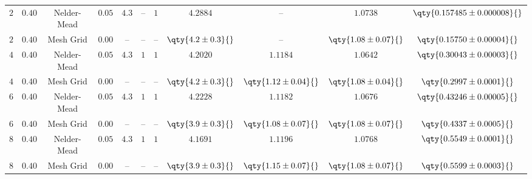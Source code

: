 \begin{tabular}{cc|ccccc|cccc}
    \rowcolor{LightCyan}
    $2$ & $0.40$ & Nelder-Mead & $0.05$ & $4.3$ & -- & $1$ & $4.2884$ & -- & $1.0738$ & $\qty{0.157485 \pm 0.000008}{}$ \\
    $2$ & $0.40$ & Mesh Grid & $0.00$ & -- & -- & -- & $\qty{4.2 \pm 0.3}{}$ & -- & $\qty{1.08 \pm 0.07}{}$ & $\qty{0.15750 \pm 0.00004}{}$ \\
    \rowcolor{LightCyan}
    $4$ & $0.40$ & Nelder-Mead & $0.05$ & $4.3$ & $1$ & $1$ & $4.2020$ & $1.1184$ & $1.0642$ & $\qty{0.30043 \pm 0.00003}{}$ \\
    $4$ & $0.40$ & Mesh Grid & $0.00$ & -- & -- & -- & $\qty{4.2 \pm 0.3}{}$ & $\qty{1.12 \pm 0.04}{}$ & $\qty{1.08 \pm 0.04}{}$ & $\qty{0.2997 \pm 0.0001}{}$ \\
    \rowcolor{LightCyan}
    $6$ & $0.40$ & Nelder-Mead & $0.05$ & $4.3$ & $1$ & $1$ & $4.2228$ & $1.1182$ & $1.0676$ & $\qty{0.43246 \pm 0.00005}{}$ \\
    $6$ & $0.40$ & Mesh Grid & $0.00$ & -- & -- & -- & $\qty{3.9 \pm 0.3}{}$ & $\qty{1.08 \pm 0.07}{}$ & $\qty{1.08 \pm 0.07}{}$ & $\qty{0.4337 \pm 0.0005}{}$ \\
    \rowcolor{LightCyan}
    $8$ & $0.40$ & Nelder-Mead & $0.05$ & $4.3$ & $1$ & $1$ & $4.1691$ & $1.1196$ & $1.0768$ & $\qty{0.5549 \pm 0.0001}{}$ \\
    $8$ & $0.40$ & Mesh Grid & $0.00$ & -- & -- & -- & $\qty{3.9 \pm 0.3}{}$ & $\qty{1.15 \pm 0.07}{}$ & $\qty{1.08 \pm 0.07}{}$ & $\qty{0.5599 \pm 0.0003}{}$ \\ \hline


\end{tabular}
